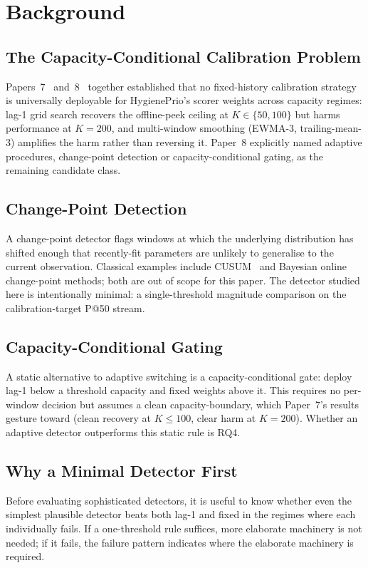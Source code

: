 \section{Background}

\subsection{The Capacity-Conditional Calibration Problem}

Papers~7~\cite{paper7online} and~8~\cite{paper8multi} together
established that no fixed-history calibration strategy is universally
deployable for HygienePrio's scorer weights across capacity regimes:
lag-1 grid search recovers the offline-peek ceiling at $K \in
\{50, 100\}$ but harms performance at $K = 200$, and multi-window
smoothing (EWMA-3, trailing-mean-3) amplifies the harm rather than
reversing it. Paper~8 explicitly named adaptive procedures, 
change-point detection or capacity-conditional gating, as the
remaining candidate class.

\subsection{Change-Point Detection}

A change-point detector flags windows at which the underlying
distribution has shifted enough that recently-fit parameters are
unlikely to generalise to the current observation. Classical
examples include CUSUM~\cite{page1954cusum} and Bayesian online
change-point methods; both are out of scope for this paper. The
detector studied here is intentionally minimal: a single-threshold
magnitude comparison on the calibration-target P@50 stream.

\subsection{Capacity-Conditional Gating}

A static alternative to adaptive switching is a capacity-conditional
gate: deploy lag-1 below a threshold capacity and fixed weights above
it. This requires no per-window decision but assumes a clean
capacity-boundary, which Paper~7's results gesture toward (clean
recovery at $K \leq 100$, clear harm at $K = 200$). Whether an
adaptive detector outperforms this static rule is RQ4.

\subsection{Why a Minimal Detector First}

Before evaluating sophisticated detectors, it is useful to know whether
even the simplest plausible detector beats both lag-1 and fixed in
the regimes where each individually fails. If a one-threshold rule
suffices, more elaborate machinery is not needed; if it fails, the
failure pattern indicates where the elaborate machinery is required.
